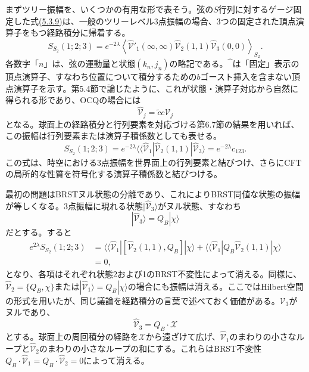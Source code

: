 まずツリー振幅を、いくつかの有用な形で表そう。弦の$S$行列に対するゲージ固定した式\hyperref[eq:5.3.9]{(5.3.9)}は、一般のツリーレベル3点振幅の場合、3つの固定された頂点演算子をもつ経路積分に帰着する。
\begin{equation}
 S_{S_2}(1;2;3)=e^{-2\lambda}\left\langle
 \widehat{\mathcal V}'_1(\infty,\infty)
 \widehat{\mathcal V}_2(1,1)\widehat{\mathcal V}_3(0,0)
 \right\rangle_{S_2}.
 \tag{9.1.4}\label{eq:9.1.4}
\end{equation}
各数字「$n$」は、弦の運動量と状態$(k_n,j_n)$の略記である。$\widehat{\phantom V}$は「固定」表示の頂点演算子、すなわち位置について積分するための$b$ゴースト挿入を含まない頂点演算子を示す。第5.4節で論じたように、これが状態・演算子対応から自然に得られる形であり、OCQの場合には
\begin{equation}
 \widehat{\mathcal V}_j=\tilde c c\mathcal V_j
 \tag{9.1.5}\label{eq:9.1.5}
\end{equation}
となる。球面上の経路積分と行列要素を対応づける第6.7節の結果を用いれば、この振幅は行列要素または演算子積係数としても表せる。
\begin{equation}
 S_{S_2}(1;2;3)=e^{-2\lambda}
 \langle\!\langle\widehat{\mathcal V}_1|
 \widehat{\mathcal V}_2(1,1)|\widehat{\mathcal V}_3\rangle
 =e^{-2\lambda}c_{123}.
 \tag{9.1.6}\label{eq:9.1.6}
\end{equation}
この式は、時空における3点振幅を世界面上の行列要素と結びつけ、さらにCFTの局所的な性質を符号化する演算子積係数と結びつける。

最初の問題はBRSTヌル状態の分離であり、これによりBRST同値な状態の振幅が等しくなる。3点振幅に現れる状態$|\widehat{\mathcal V}_3\rangle$がヌル状態、すなわち
\begin{equation}
 |\widehat{\mathcal V}_3\rangle=Q_B|\chi\rangle
 \tag{9.1.7}\label{eq:9.1.7}
\end{equation}
だとする。すると
\begin{equation}
 \begin{aligned}
 e^{2\lambda}S_{S_2}(1;2;3)
 &=\langle\!\langle\widehat{\mathcal V}_1|
 [\widehat{\mathcal V}_2(1,1),Q_B]|\chi\rangle
 +\langle\!\langle\widehat{\mathcal V}_1|
 Q_B\widehat{\mathcal V}_2(1,1)|\chi\rangle\\
 &=0,
 \end{aligned}
 \tag{9.1.8}\label{eq:9.1.8}
\end{equation}
となり、各項はそれぞれ状態2および1のBRST不変性によって消える。同様に、$\widehat{\mathcal V}_2=\{Q_B,\chi\}$または$|\widehat{\mathcal V}_1\rangle=Q_B|\chi\rangle$の場合にも振幅は消える。ここではHilbert空間の形式を用いたが、同じ議論を経路積分の言葉で述べておく価値がある。$\mathcal V_3$がヌルであり、
\begin{equation}
 \widehat{\mathcal V}_3=Q_B\cdot\mathcal X
 \tag{9.1.9}\label{eq:9.1.9}
\end{equation}
とする。球面上の周回積分の経路を$\mathcal X$から遠ざけて広げ、$\widehat{\mathcal V}_1$のまわりの小さなループと$\widehat{\mathcal V}_2$のまわりの小さなループの和にする。これらはBRST不変性$Q_B\cdot\widehat{\mathcal V}_1=Q_B\cdot\widehat{\mathcal V}_2=0$によって消える。

